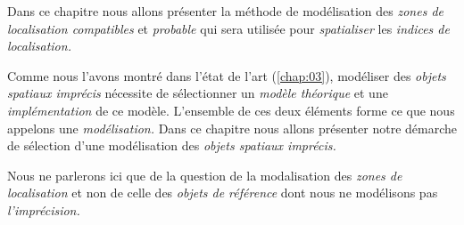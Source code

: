 Dans ce chapitre nous allons présenter la méthode de modélisation des
\emph{zones de localisation compatibles} et \emph{probable} qui sera
utilisée pour \emph{spatialiser} les \emph{indices de localisation.}



Comme nous l'avons montré dans l'état de l'art (\autoref{chap:03}),
modéliser des \emph{objets spatiaux imprécis} nécessite de
sélectionner un \emph{modèle théorique} et une \emph{implémentation}
de ce modèle. L'ensemble de ces deux éléments forme ce que nous
appelons une \emph{modélisation.} Dans ce chapitre nous allons
présenter notre démarche de sélection d'une modélisation des \emph{objets
spatiaux imprécis.}


Nous ne parlerons ici que de la question de la modalisation des
\emph{zones de localisation} et non de celle des \emph{objets de
  référence} dont nous ne modélisons pas \emph{l'imprécision.}


